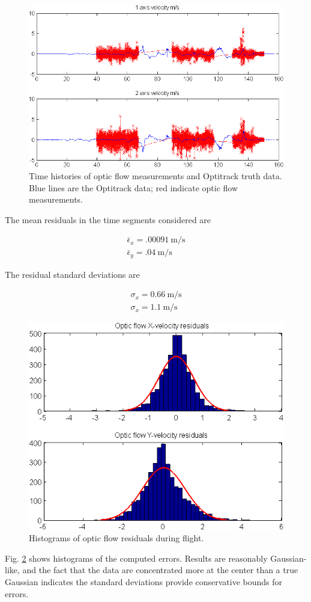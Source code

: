 \documentclass{article}
\begin{document}
\begin{figure}[tb!]
\centering
\includegraphics[scale=0.8]{../moving_flying_vel_comp.png}
\caption{Time histories of optic flow measurements and Optitrack truth data. Blue lines are the Optitrack data; red indicate optic flow measurements.}
\label{fig:movingflyingvelcomp}
\end{figure}

The mean residuals in the time segments considered are

\begin{eqnarray}
\bar{\epsilon}_x = .00091 \ \mathrm{m/s} \\
\bar{\epsilon}_y = .04 \ \mathrm{m/s}
\end{eqnarray}

The residual standard deviations are

\begin{eqnarray}
\sigma_x = 0.66 \ \mathrm{m/s} \\
\sigma_x = 1.1 \ \mathrm{m/s}
\end{eqnarray}

\begin{figure}[tb!]
\centering
\includegraphics[scale=0.8]{../moving_flying_flow_hist.png}
\caption{Histograms of optic flow residuals during flight.}
\label{fig:movingflyingflowhist}
\end{figure}

Fig. \ref{fig:movingflyingflowhist} shows histograms of the computed errors. Results are reasonably Gaussian-like, and the fact that the data are concentrated more at the center than a true Gaussian indicates the standard deviations provide conservative bounds for errors.



\end{document}
